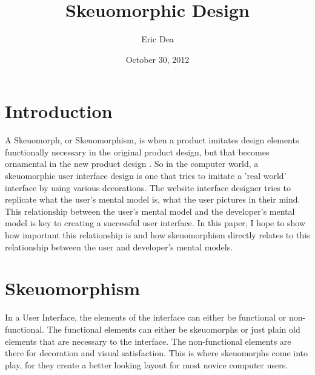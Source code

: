 \documentclass{article}
\title{Skeuomorphic Design}
\author{Eric Dea}
\date{October 30, 2012}
\begin{document}
\maketitle


\pagebreak
\tableofcontents

\pagebreak
\listoffigures

\pagebreak
\listoftables

\pagebreak

%
%
\section{Introduction}
\label{introduction}

A Skeuomorph, or Skeuomorphism, is when a product imitates design elements functionally necessary in the original product design, but that becomes ornamental in the new product design \cite{wiki}.  So in the computer world, a skeuomorphic user interface design is one that tries to imitate a 'real world' interface by using various decorations.  The website interface designer tries to replicate what the user's mental model is, what the user pictures in their mind.  This relationship between the user's mental model and the developer's mental model is key to creating a successful user interface.  In this paper, I hope to show how important this relationship is and how skeuomorphism directly relates to this relationship between the user and developer's mental models.


\section{Skeuomorphism}

In a User Interface, the elements of the interface can either be functional or non-functional.  The functional elements can either be skeuomorphs or just plain old elements that are necessary to the interface.  The non-functional elements are there for decoration and visual satisfaction.  This is where skeuomorphs come into play, for they create a better looking layout for most novice computer users.
\end{document}
